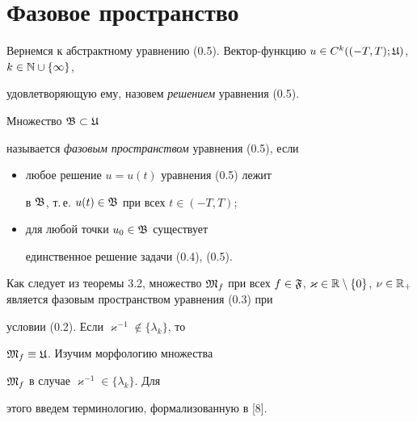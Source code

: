 \section{Фазовое пространство}





Вернемся к абстрактному уравнению (0.5). Вектор-функцию $u \in


C^k((-T, T);{\frak U})$, $k \in {\Bbb N} \cup \{ \infty \}$,


удовлетворяющую ему, назовем {\it решением} уравнения (0.5).





\begin{defns}


Множество ${\frak B} \subset {\frak U}$


называется {\it фазовым пространством} уравнения (0.5), если


\begin{itemize}


\item[(i)] любое решение $u = u(t)$ уравнения (0.5) лежит 


в ${\frak B}$, т.\,е. $u(t) \in {\frak B}$ при всех $t \in (-T, T)$;


\item[(ii)] для любой точки $u_0 \in {\frak B}$ существует 


единственное решение задачи (0.4), (0.5).


\end{itemize}


\end{defns}





Как следует из теоремы 3.2, множество ${\frak M}_f$ при всех $f


\in {\frak F}$, $\varkappa \in {\Bbb R} \setminus \{ 0 \}$, $\nu \in


{\Bbb R}_+$ является фазовым пространством уравнения (0.3) при


условии (0.2). Если $\varkappa^{-1} \notin \{ \lambda_k \}$, то


${\frak M}_f \equiv {\frak U}$. Изучим морфологию множества


${\frak M}_f$ в случае $\varkappa^{-1} \in \{ \lambda_k \}$. Для


этого введем терминологию, формализованную в [8].





